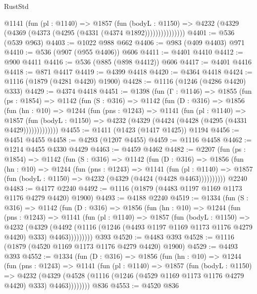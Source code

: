 \begin{lexlean}{RustStd}
\begin{coremodule}
                @1141
                  (fun (pl : @1140) =>
                  @1857
                    (fun (bodyL : @1150) =>
                    @4232 (@4329 (@4369 (@4373 (@4295 (@4331 (@4374 @1892)))))))))))))))
@4401 := @536 (@539 @963)
@4403 := @1022 @988 @662
@4406 := @983 (@409 @4403) @971
@4410 := @536 (@907 (@955 @4406)) @606
@4411 := @4401 @4410
@4412 := @900 @4411
@4416 := @536 (@885 (@898 @4412)) @606
@4417 := @4401 @4416
@4418 := @871 @4417
@4419 := @4399 @4418
@4420 := @4364 @4418
@4424 := @1116 (@1879 (@4281 @4420) @1900)
@4428 := @1116 (@1246 (@4286 @4420) @333)
@4429 := @4374 @4418
@4451 := @1398
    (fun (Γ : @1146) =>
    @1855
      (fun (ps : @1854) =>
      @1142
        (fun (S : @316) =>
        @1142
          (fun (D : @316) =>
          @1856
            (fun (hn : @10) =>
            @1244
              (fun (pns : @1243) =>
              @1141
                (fun (pl : @1140) =>
                @1857
                  (fun (bodyL : @1150) =>
                  @4232 (@4329 (@4424 (@4428 (@4295 (@4331 @4429)))))))))))))
@4455 := @1411 (@1423 (@1417 @1425)) @1194
@4456 := @4451 @4455
@4458 := @4293 (@1207 @4455)
@4459 := @1116 @4458
@4462 := @1214 @4455 @4330 @4429
@4463 := @4459 @4462
@4482 := @2207
    (fun (ps : @1854) =>
    @1142
      (fun (S : @316) =>
      @1142
        (fun (D : @316) =>
        @1856
          (fun (hn : @10) =>
          @1244
            (fun (pns : @1243) =>
            @1141
              (fun (pl : @1140) =>
              @1857 (fun (bodyL : @1150) => @4232 (@4329 (@4424 (@4428 @4463))))))))))
    @2240
@4483 := @4177 @2240
@4492 := @1116 (@1879 (@4483 @1197 @1169 @1173 @1176 @4279 @4420) @1900)
@4493 := @4188 @2240
@4519 := @1334
    (fun (S : @316) =>
    @1142
      (fun (D : @316) =>
      @1856
        (fun (hn : @10) =>
        @1244
          (fun (pns : @1243) =>
          @1141
            (fun (pl : @1140) =>
            @1857
              (fun (bodyL : @1150) =>
              @4232
                (@4329
                  (@4492
                    (@1116 (@1246 (@4493 @1197 @1169 @1173 @1176 @4279 @4420) @333) @4463)))))))))
    @393
@4520 := @4483 @393
@4528 := @1116 (@1879 (@4520 @1169 @1173 @1176 @4279 @4420) @1900)
@4529 := @4493 @393
@4552 := @1334
    (fun (D : @316) =>
    @1856
      (fun (hn : @10) =>
      @1244
        (fun (pns : @1243) =>
        @1141
          (fun (pl : @1140) =>
          @1857
            (fun (bodyL : @1150) =>
            @4232
              (@4329 (@4528 (@1116 (@1246 (@4529 @1169 @1173 @1176 @4279 @4420) @333) @4463))))))))
    @836
@4553 := @4520 @836

\end{coremodule}
\end{lexlean}
